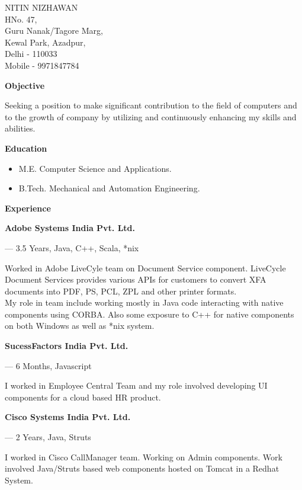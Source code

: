 \documentclass{article}
\begin{document}
  \begin{flushright}
{\LARGE NITIN NIZHAWAN}\\[11pt]
HNo. 47,\\
Guru Nanak/Tagore Marg,\\
Kewal Park, Azadpur,\\
Delhi - 110033\\
Mobile - 9971847784
  \end{flushright}
\hrulefill

\begin{flushleft} {\large\bf Objective}
\end{flushleft}

Seeking a position to make significant contribution to the field of computers and to the growth of company by utilizing and continuously enhancing my skills and abilities.
\begin{flushleft}
\large\bf{Education}
\end{flushleft}
\begin{itemize}
\item M.E. Computer Science and Applications.
\item  B.Tech. Mechanical and Automation Engineering.
\end{itemize}
\begin{flushleft}
\large\bf{Experience}
\end{flushleft}

\begin{center}
   \bf{Adobe Systems India Pvt. Ltd.}\\
\end{center}
\begin{flushright} --- 3.5 Years, Java, C++, Scala, *nix \end{flushright}
   Worked in Adobe LiveCyle team on Document Service component. LiveCycle Document Services provides various APIs for customers to convert XFA documents into PDF, PS, PCL, ZPL and other printer formats.\\
   
   My role in team include working mostly in Java code interacting with native components using CORBA. Also some exposure to C++ for native components on both Windows as well as *nix system.
\begin{center}
   \bf{SucessFactors India Pvt. Ltd.}\\ 
\end{center}
\begin{flushright}--- 6 Months, Javascript\end{flushright}
   I worked in Employee Central Team and my role involved developing UI components for a cloud based HR product.
\begin{center}
   \bf{Cisco Systems India Pvt. Ltd.}\\
\end{center}
\begin{flushright} --- 2 Years, Java, Struts \end{flushright}
   I worked in Cisco CallManager team. Working on Admin components. Work involved Java/Struts based web components hosted on Tomcat in a Redhat System.
\end{document}
